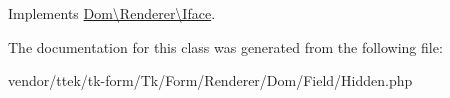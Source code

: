 Implements \hyperlink{interfaceDom_1_1Renderer_1_1Iface_a79a0ba41fb6714d69156891d6326bd33}{Dom\textbackslash{}\+Renderer\textbackslash{}\+Iface}.



The documentation for this class was generated from the following file\+:\begin{DoxyCompactItemize}
\item 
vendor/ttek/tk-\/form/\+Tk/\+Form/\+Renderer/\+Dom/\+Field/Hidden.\+php\end{DoxyCompactItemize}
